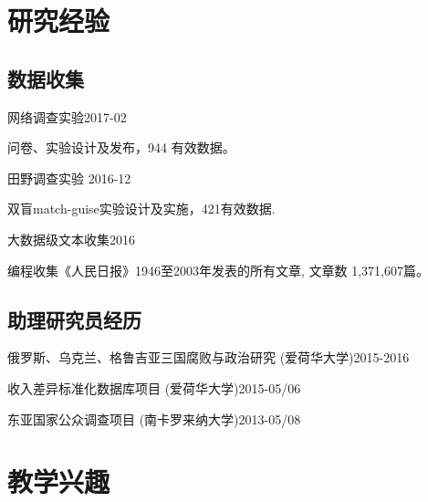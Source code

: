 \documentclass[10.5pt,]{article}
\providecommand{\tightlist}{%
  \setlength{\itemsep}{0pt}\setlength{\parskip}{0pt}}
\renewenvironment{itemize}{
  \begin{list}{}{
    \setlength{\leftmargin}{1.5em}
  }
}{
  \end{list}
}
\begin{document}
\section{研究经验}

\subsection{数据收集}

\begin{itemize}
\tightlist
\item
  网络调查实验\hfill 2017-02

  \begin{itemize}
  \tightlist
  \item
    \footnotesize 问卷、实验设计及发布，944 有效数据。
  \end{itemize}
\item
  田野调查实验 \hfill 2016-12

  \begin{itemize}
  \tightlist
  \item
    \footnotesize 双盲match-guise实验设计及实施，421有效数据.
  \end{itemize}
\item
  大数据级文本收集\hfill 2016

  \begin{itemize}
  \tightlist
  \item
    \footnotesize 编程收集《人民日报》1946至2003年发表的所有文章, 文章数
    1,371,607篇。
  \end{itemize}
\end{itemize}

\subsection{助理研究员经历}

\begin{itemize}
\tightlist
\item
  俄罗斯、乌克兰、格鲁吉亚三国腐败与政治研究
  (爱荷华大学)\hfill 2015-2016
\item
  收入差异标准化数据库项目 (爱荷华大学)\hfill 2015-05/06
\item
  东亚国家公众调查项目 (南卡罗来纳大学)\hfill 2013-05/08
\end{itemize}

\section{教学兴趣}
\end{document}
